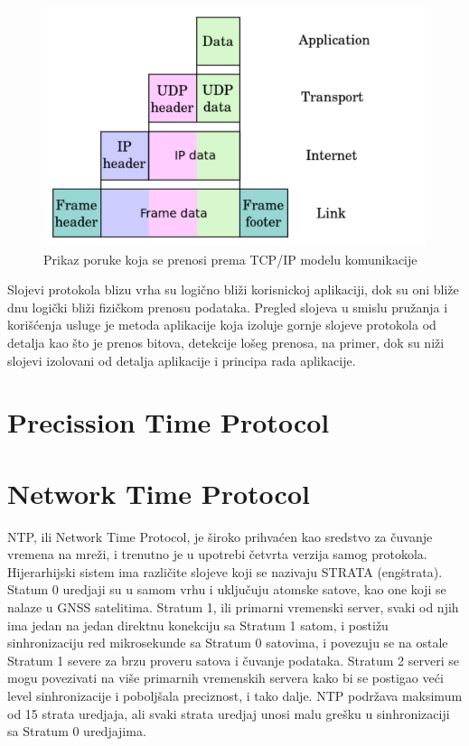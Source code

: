 \documentclass[a4paper,12pt, master]{etf}
\begin{document}
	\begin{figure}[htb]
			\centering
			\includegraphics[scale=.4]{../pic/tcpip_data.png}
			\caption{Prikaz poruke koja se prenosi prema TCP/IP modelu
					komunikacije}
			\label{fig:tcpip_data}
	\end{figure}

	Slojevi protokola blizu vrha su logi\v{c}no bli\v{z}i korisnickoj
	aplikaciji, dok su oni bli\v{z}e dnu logi\v{c}ki bli\v{z}i fizi\v{c}kom
	prenosu podataka. Pregled slojeva u smislu pru\v{z}anja i kori\v{s}\'{c}enja
	usluge je metoda aplikacije koja izoluje gornje slojeve protokola od
	detalja kao \v{s}to je prenos bitova, detekcije lo\v{s}eg prenosa, na
	primer, dok su ni\v{z}i slojevi izolovani od detalja aplikacije i principa
	rada aplikacije.

	\section{Precission Time Protocol}

	\section{Network Time Protocol}

	NTP, ili Network Time Protocol, je \v{s}iroko prihva\'{c}en kao sredstvo za
	\v{c}uvanje vremena na mre\v{z}i, i trenutno je u upotrebi \v{c}etvrta
	verzija samog protokola. Hijerarhijski sistem ima razli\v{c}ite slojeve
	koji se nazivaju STRATA (eng\. strata). Statum 0 uredjaji su u samom vrhu i
	uklju\v{c}uju atomske satove, kao one koji se nalaze u GNSS	satelitima.
	Stratum 1, ili primarni vremenski server, svaki od njih ima jedan na jedan
	direktnu konekciju sa Stratum 1 satom, i posti\v{z}u sinhronizaciju red
	mikrosekunde sa Stratum	0 satovima, i povezuju se na ostale Stratum 1
	severe za brzu proveru satova i \v{c}uvanje	podataka. Stratum 2 serveri se
	mogu povezivati na vi\v{s}e primarnih vremenskih servera kako bi se
	postigao ve\'{c}i level sinhronizacije i pobolj\v{s}ala preciznost, i tako
	dalje. NTP podr\v{z}ava maksimum od 15 strata uredjaja, ali svaki strata
	uredjaj unosi malu gre\v{s}ku u	sinhronizaciji sa Stratum 0 uredjajima.
\end{document}
